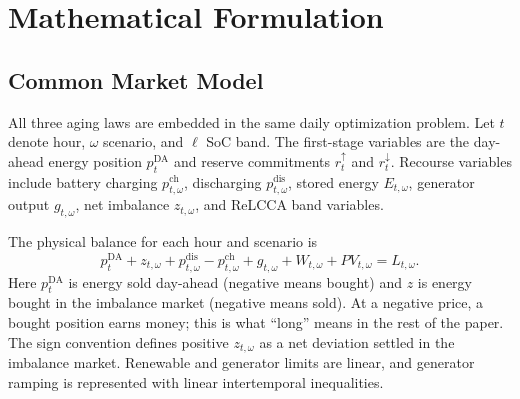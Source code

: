 \documentclass[journal,12pt,twocolumn]{IEEEtran}
\begin{document}
\section{Mathematical Formulation}
\label{sec:formulation}

\subsection{Common Market Model}
All three aging laws are embedded in the same daily optimization problem. Let $t$ denote hour, $\omega$ scenario, and $\ell$ SoC band. The first-stage variables are the day-ahead energy position $p_t^{\text{DA}}$ and reserve commitments $r_t^{\uparrow}$ and $r_t^{\downarrow}$. Recourse variables include battery charging $p_{t,\omega}^{\text{ch}}$, discharging $p_{t,\omega}^{\text{dis}}$, stored energy $E_{t,\omega}$, generator output $g_{t,\omega}$, net imbalance $z_{t,\omega}$, and ReLCCA band variables.

The physical balance for each hour and scenario is
\begin{equation}
p_t^{\text{DA}} + z_{t,\omega} + p_{t,\omega}^{\text{dis}} - p_{t,\omega}^{\text{ch}} + g_{t,\omega} + W_{t,\omega} + PV_{t,\omega} = L_{t,\omega}.
\label{eq:balance}
\end{equation}
Here $p_t^{\text{DA}}$ is energy sold day-ahead (negative means bought) and $z$ is energy bought in the imbalance market (negative means sold). At a negative price, a bought position earns money; this is what ``long'' means in the rest of the paper. The sign convention defines positive $z_{t,\omega}$ as a net deviation settled in the imbalance market. Renewable and generator limits are linear, and generator ramping is represented with linear intertemporal inequalities.
\end{document}
